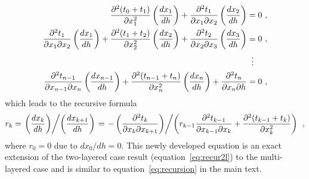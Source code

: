 \begin{align}
 \frac{\partial^2 (t_0 + t_1)}{\partial x_1^2} \left( \frac{d x_1}{d h}\right) + \frac{\partial^2 t_1}{\partial x_1 \partial x_2} \left( \frac{d x_2}{d h}\right) & = 0~, \\
 \nonumber
\frac{\partial^2 t_{1}}{\partial x_{1} \partial x_2} \left( \frac{d x_{1}}{d h}\right) + \frac{\partial^2 (t_{1} + t_2)}{\partial x_2^2} \left( \frac{d x_2}{d h}\right) + \frac{\partial^2 t_2}{\partial x_2 \partial x_{3}}\left( \frac{d x_{3}}{d h}\right) & = 0~, \\
   &\;\;\vdots \notag \\
\nonumber
\frac{\partial^2 t_{n-1}}{\partial x_{n-1} \partial x_n} \left( \frac{d x_{n-1}}{d h}\right) + \frac{\partial^2 (t_{n-1} + t_n)}{\partial x_n^2} \left( \frac{d x_n}{d h}\right) + \frac{\partial^2 t_n}{\partial x_n \partial h} &= 0~, 
\end{align}
which leads to the recursive formula 
\begin{equation}
\label{eq:rnl}
 r_k = \left. \left( \frac{d x_k}{d h}\right) \middle/ \left( \frac{d x_{k+1}}{d h}\right)\right. = \left. -\left( \frac{\partial^2 t_k}{\partial x_k \partial x_{k+1}} \right) \middle/ \left(  r_{k-1} \frac{\partial^2 t_{k-1}}{\partial x_{k-1} \partial x_k}  + \frac{\partial^2 (t_{k-1} + t_k)}{\partial x_k^2} \right)\right. ~,
\end{equation}
where $r_0 = 0$ due to $dx_0/dh = 0$. This newly developed equation is an exact extension of the two-layered case result (equation~\ref{eq:recur2l}) to the multi-layered case and is similar to equation~\ref{eq:recursion} in the main text.


